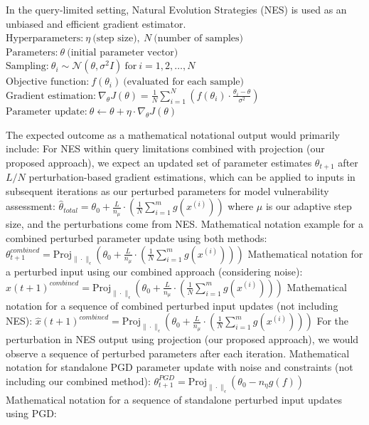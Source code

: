 
In the query-limited setting, Natural Evolution Strategies (NES) is used as an unbiased and efficient gradient estimator.
$\text{Hyperparameters:} \ \eta \ \text{(step size)}, \ N \ \text{(number of samples)}$
$\text{Parameters:} \ \theta \ \text{(initial parameter vector)}$
$\text{Sampling:} \ \theta_i \sim \mathcal{N}(\theta, \sigma^2 I) \ \text{for} \ i = 1, 2, \ldots, N$
$\text{Objective function:} \ f(\theta_i) \ \text{(evaluated for each sample)}$
$\text{Gradient estimation:} \ \nabla_{\theta} J(\theta) = \frac{1}{N} \sum_{i=1}^{N} \left( f(\theta_i) \cdot \frac{\theta_i - \theta}{\sigma^2} \right)$
$\text{Parameter update:} \ \theta \leftarrow \theta + \eta \cdot \nabla_{\theta} J(\theta)$

The expected outcome as a mathematical notational output would primarily include:
For NES within query limitations combined with projection (our proposed approach), we expect an updated set of parameter estimates $\theta_{t+1}$ after $L/N$ perturbation-based gradient estimations, which can be applied to inputs in subsequent iterations as our perturbed parameters for model vulnerability assessment:
$\hat{\theta}_{total} = \theta_0 + \frac{L}{n_\mu} \cdot \left( \frac{1}{N} \sum_{i=1}^{m} g(x^{(i)}) \right)$
where $\mu$ is our adaptive step size, and the perturbations come from NES. 
Mathematical notation example for a combined perturbed parameter update using both methods:
$\theta_{t+1}^{combined} = \text{Proj}_{\|\cdot\|_{\epsilon}} \left( \theta_0 + \frac{L}{n_\mu} \cdot \left( \frac{1}{N} \sum_{i=1}^{m} g(x^{(i)}) \right) \right)$
Mathematical notation for a perturbed input using our combined approach (considering noise):
$\hat{x}(t+1)^{combined} = \text{Proj}_{\|\cdot\|_{\epsilon}} \left( \theta_0 + \frac{L}{n_\mu} \cdot \left( \frac{1}{N} \sum_{i=1}^{m} g(x^{(i)}) \right) \right)$
Mathematical notation for a sequence of combined perturbed input updates (not including NES):
$\hat{x}(t+1)^{combined} = \text{Proj}_{\|\cdot\|_{\epsilon}} \left( \theta_0 + \frac{L}{n_\mu} \cdot \left( \frac{1}{N} \sum_{i=1}^{m} g(x^{(i)}) \right) \right)$
For the perturbation in NES output using projection (our proposed approach), we would observe a sequence of perturbed parameters after each iteration. Mathematical notation for standalone PGD parameter update with noise and constraints (not including our combined method):
$\theta_{t+1}^{PGD} = \text{Proj}_{\|\cdot\|_{\epsilon}} \left( \theta_0 - n_\eta g(f) \right)$
Mathematical notation for a sequence of standalone perturbed input updates using PGD:
